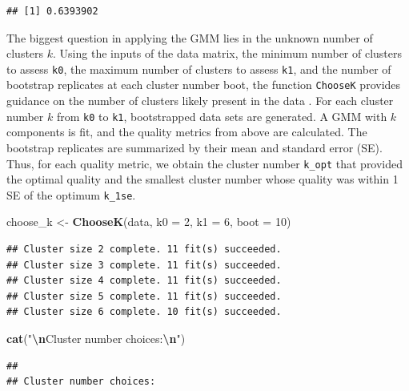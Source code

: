\documentclass[12pt]{article}
\newenvironment{Shaded}{\begin{snugshade}}{\end{snugshade}}
\newcommand{\AttributeTok}[1]{\textcolor[rgb]{0.13,0.29,0.53}{#1}}
\newcommand{\DecValTok}[1]{\textcolor[rgb]{0.00,0.00,0.81}{#1}}
\newcommand{\FunctionTok}[1]{\textcolor[rgb]{0.13,0.29,0.53}{\textbf{#1}}}
\newcommand{\NormalTok}[1]{#1}
\newcommand{\OtherTok}[1]{\textcolor[rgb]{0.56,0.35,0.01}{#1}}
\newcommand{\SpecialCharTok}[1]{\textcolor[rgb]{0.81,0.36,0.00}{\textbf{#1}}}
\newcommand{\StringTok}[1]{\textcolor[rgb]{0.31,0.60,0.02}{#1}}
\begin{document}
\begin{verbatim}
## [1] 0.6393902
\end{verbatim}

The biggest question in applying the GMM lies in the unknown number of
clusters \(k\). Using the inputs of the data matrix, the minimum number
of clusters to assess \texttt{k0}, the maximum number of clusters to
assess \texttt{k1}, and the number of bootstrap replicates at each
cluster number boot, the function \texttt{ChooseK} provides guidance on
the number of clusters likely present in the data
\citep{McCaw2019.12.20.884551}. For each cluster number \(k\) from
\texttt{k0} to \texttt{k1}, bootstrapped data sets are generated. A GMM
with \(k\) components is fit, and the quality metrics from above are
calculated. The bootstrap replicates are summarized by their mean and
standard error (SE). Thus, for each quality metric, we obtain the
cluster number \texttt{k\_opt} that provided the optimal quality and the
smallest cluster number whose quality was within 1 SE of the optimum
\texttt{k\_1se}.

\begin{Shaded}
\begin{Highlighting}[]
\NormalTok{choose\_k }\OtherTok{\textless{}{-}} \FunctionTok{ChooseK}\NormalTok{(data, }\AttributeTok{k0 =} \DecValTok{2}\NormalTok{, }\AttributeTok{k1 =} \DecValTok{6}\NormalTok{, }\AttributeTok{boot =} \DecValTok{10}\NormalTok{)}
\end{Highlighting}
\end{Shaded}

\begin{verbatim}
## Cluster size 2 complete. 11 fit(s) succeeded.
## Cluster size 3 complete. 11 fit(s) succeeded.
## Cluster size 4 complete. 11 fit(s) succeeded.
## Cluster size 5 complete. 11 fit(s) succeeded.
## Cluster size 6 complete. 10 fit(s) succeeded.
\end{verbatim}

\begin{Shaded}
\begin{Highlighting}[]
\FunctionTok{cat}\NormalTok{(}\StringTok{"}\SpecialCharTok{\textbackslash{}n}\StringTok{Cluster number choices:}\SpecialCharTok{\textbackslash{}n}\StringTok{"}\NormalTok{)}
\end{Highlighting}
\end{Shaded}

\begin{verbatim}
## 
## Cluster number choices:
\end{verbatim}
\end{document}
